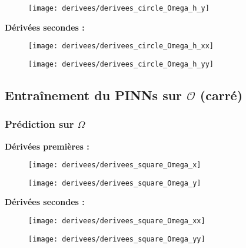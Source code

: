 \begin{figure}[H]
	\centering
	\texttt{[image: derivees/derivees\_circle\_Omega\_h\_y]}
	\label{fig:deriveescircleomegahy}
\end{figure}

\newpage

\textbf{Dérivées secondes :}

\begin{figure}[H]
	\centering
	\texttt{[image: derivees/derivees\_circle\_Omega\_h\_xx]}
	\label{fig:deriveescircleomegahxx}
\end{figure}

\begin{figure}[H]
	\centering
	\texttt{[image: derivees/derivees\_circle\_Omega\_h\_yy]}
	\label{fig:deriveescircleomegahyy}
\end{figure}

\newpage

\subsection{Entraînement du PINNs sur $\mathcal{O}$ (carré)}

\subsubsection{Prédiction sur $\Omega$}

\textbf{Dérivées premières :}

\begin{figure}[H]
	\centering
	\texttt{[image: derivees/derivees\_square\_Omega\_x]}
	\label{fig:deriveessquareomegax}
\end{figure}

\begin{figure}[H]
	\centering
	\texttt{[image: derivees/derivees\_square\_Omega\_y]}
	\label{fig:deriveessquareomegay}
\end{figure}

\newpage

\textbf{Dérivées secondes :}

\begin{figure}[H]
	\centering
	\texttt{[image: derivees/derivees\_square\_Omega\_xx]}
	\label{fig:deriveessquareomegaxx}
\end{figure}

\begin{figure}[H]
	\centering
	\texttt{[image: derivees/derivees\_square\_Omega\_yy]}
	\label{fig:deriveessquareomegayy}
\end{figure}

